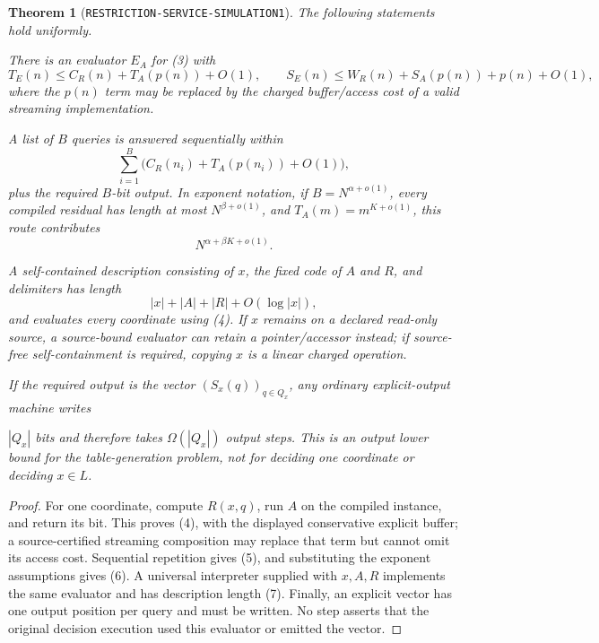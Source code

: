 \documentclass[11pt]{article}
\newtheorem{theorem}{Theorem}
\begin{document}
\begin{theorem}[\texttt{RESTRICTION-SERVICE-SIMULATION1}]
The following statements hold uniformly.
\begin{description}[leftmargin=2.2cm,style=nextline]
\item[Coordinate.] There is an evaluator $E_{A}$ for (3) with
\[
T_E(n)\le C_R(n)+T_A(p(n))+O(1),\qquad
S_E(n)\le W_R(n)+S_A(p(n))+p(n)+O(1),                  \tag{4}
\]
where the $p(n)$ term may be replaced by the charged buffer/access cost of
a valid streaming implementation.
\item[Batch.] A list of $B$ queries is answered sequentially within
\[
\sum_{i=1}^{B}\bigl(C_R(n_i)+T_A(p(n_i))+O(1)\bigr),    \tag{5}
\]
plus the required $B$-bit output.  In exponent notation, if
$B=N^{\alpha+o(1)}$, every compiled residual has length at most
$N^{\beta+o(1)}$, and $T_A(m)=m^{K+o(1)}$, this route contributes
\[
N^{\alpha+\beta K+o(1)}.                               \tag{6}
\]
\item[Compact evaluator.] A self-contained description consisting of $x$,
the fixed code of $A$ and $R$, and delimiters has length
\[
|x|+|A|+|R|+O(\log |x|),                               \tag{7}
\]
and evaluates every coordinate using (4).  If $x$ remains on a declared
read-only source, a source-bound evaluator can retain a pointer/accessor
instead; if source-free self-containment is required, copying $x$ is a
linear charged operation.
\item[Explicit table.] If the required output is the vector
$(S_x(q))_{q\in Q_x}$, any ordinary explicit-output machine writes

$|Q_x|$ bits and therefore takes $\Omega(|Q_x|)$ output steps.  This is
an output lower bound for the table-generation problem, not for deciding
one coordinate or deciding $x\in L$.
\end{description}
\end{theorem}

\begin{proof}
For one coordinate, compute $R(x,q)$, run $A$ on the compiled instance,
and return its bit.  This proves (4), with the displayed conservative explicit
buffer; a source-certified streaming composition may replace that term but
cannot omit its access cost.  Sequential repetition gives (5), and substituting
the exponent assumptions gives (6).  A universal interpreter supplied with
$x,A,R$ implements the same evaluator and has description length (7).
Finally, an explicit vector has one output position per query and must be
written.  No step asserts that the original decision execution used this
evaluator or emitted the vector.
\end{proof}
\end{document}
